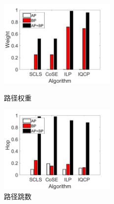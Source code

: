 \begin{figure}[htbp]
\centering
\begin{minipage}[t]{0.45\linewidth}
\centering
\includegraphics[width=2.25in]{figures/weight}
\caption{路径权重}
\label{fig:normalization weitgh sum}
\end{minipage}
\hfill
\begin{minipage}[t]{0.45\linewidth}
\centering
\includegraphics[width=2.25in]{figures/hop}
\caption{路径跳数}
\label{fig:normalization hop}
\end{minipage}
\end{figure}


